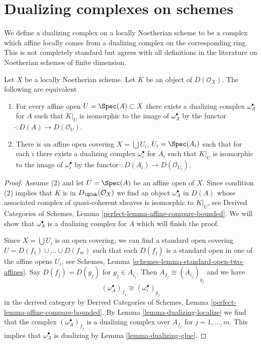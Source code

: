 \section{Dualizing complexes on schemes}
\label{section-dualizing-schemes}

\noindent
We define a dualizing complex on a locally Noetherian scheme
to be a complex which affine locally comes from a dualizing
complex on the corresponding ring. This is not completely
standard but agrees with all definitions in the literature
on Noetherian schemes of finite dimension.

\begin{lemma}
\label{lemma-equivalent-definitions}
Let $X$ be a locally Noetherian scheme. Let $K$ be an object of
$D(\mathcal{O}_X)$. The following are equivalent
\begin{enumerate}
\item For every affine open $U = \Spec(A) \subset X$ there exists
a dualizing complex $\omega_A^\bullet$ for $A$ such that
$K|_U$ is isomorphic to the image of $\omega_A^\bullet$ by
the functor $\widetilde{} : D(A) \to D(\mathcal{O}_U)$.
\item There is an affine open covering $X = \bigcup U_i$, $U_i = \Spec(A_i)$
such that for each $i$ there exists a dualizing complex $\omega_i^\bullet$
for $A_i$ such that $K|_U$ is isomorphic to the image of $\omega_i^\bullet$ by
the functor $\widetilde{} : D(A_i) \to D(\mathcal{O}_{U_i})$.
\end{enumerate}
\end{lemma}

\begin{proof}
Assume (2) and let $U = \Spec(A)$ be an affine open of $X$.
Since condition (2) implies that $K$ is in $D_\QCoh(\mathcal{O}_X)$
we find an object $\omega_A^\bullet$ in $D(A)$ whose associated
complex of quasi-coherent sheaves is isomorphic to $K|_U$, see
Derived Categories of Schemes, Lemma
\ref{perfect-lemma-affine-compare-bounded}.
We will show that $\omega_A^\bullet$ is a dualizing complex for $A$
which will finish the proof.

\medskip\noindent
Since $X = \bigcup U_i$ is an open covering, we can find a standard
open covering $U = D(f_1) \cup \ldots \cup D(f_m)$ such that
each $D(f_j)$ is a standard open in one of the affine opens $U_i$, see
Schemes, Lemma \ref{schemes-lemma-standard-open-two-affines}.
Say $D(f_j) = D(g_j)$ for $g_j \in A_{i_j}$.
Then $A_{f_j} \cong (A_{i_j})_{g_j}$ and we have
$$
(\omega_A^\bullet)_{f_j} \cong (\omega_i^\bullet)_{g_j}
$$
in the derived category by
Derived Categories of Schemes, Lemma
\ref{perfect-lemma-affine-compare-bounded}.
By Lemma \ref{lemma-dualizing-localize} we find that
the complex $(\omega_A^\bullet)_{f_j}$ is a dualizing complex over
$A_{f_j}$ for $j = 1, \ldots, m$. This implies that $\omega_A^\bullet$
is dualizing by Lemma \ref{lemma-dualizing-glue}.
\end{proof}

